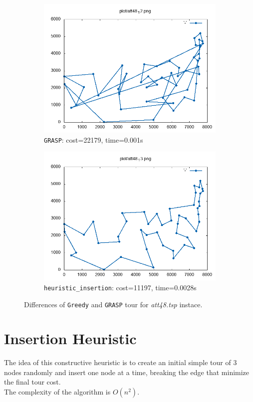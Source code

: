 \begin{figure}[!h]
\begin{subfigure}{.49\textwidth}
	\centering
	\includegraphics[width=\columnwidth]{../res/att48_12_3.png}
	\caption{\texttt{GRASP}: cost=22179, time=0.001s}
	\label{fig:att48_GRASP3}
	\end{subfigure}
	\begin{subfigure}{.49\textwidth}
	\centering
	\includegraphics[width=\columnwidth]{../res/att48_13.png}
	\caption{\texttt{heuristic\_insertion}: cost=11197, time=0.0028s}
	\label{fig:att48_insertion}
	\end{subfigure}
	\caption{Differences of \texttt{Greedy} and \texttt{GRASP} tour for \textit{att48.tsp} instace.}
	\label{fig:att48_diff}
\end{figure}


\section{Insertion Heuristic}
The idea of this constructive heuristic is to create an initial simple tour of 3 nodes randomly and insert one node at a time, breaking the edge that minimize the final tour cost.\\
The complexity of the algorithm is $ O(n^2) $.


